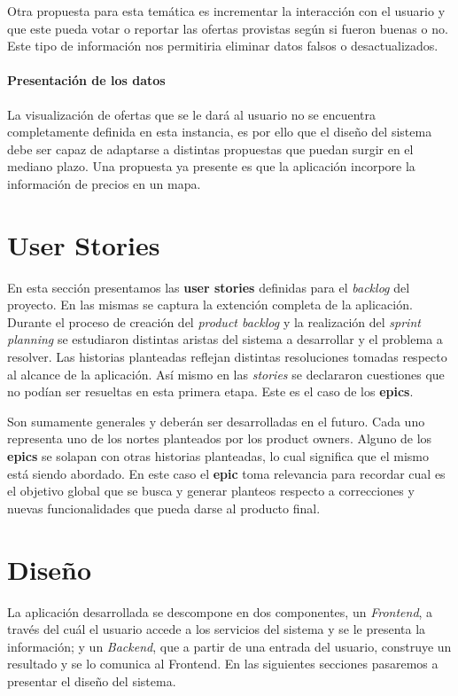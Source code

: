 \documentclass[10pt, a4paper]{article}
\begin{document}
Otra propuesta para esta temática es incrementar la interacción con el usuario y que este pueda votar o reportar las ofertas provistas según si fueron buenas o no. Este tipo de información nos permitiria eliminar datos falsos o desactualizados.

\paragraph{Presentación de los datos}
La visualización de ofertas que se le dará al usuario no se encuentra completamente definida en esta instancia, es por ello que el diseño del sistema debe ser capaz de adaptarse a distintas propuestas que puedan surgir en el mediano plazo. Una propuesta ya presente es que la aplicación incorpore la información de precios en un mapa.


\section{User Stories}

En esta sección presentamos las \textbf{user stories} definidas para el \emph{backlog} del proyecto. En las mismas se captura la extención completa de la aplicación. Durante el proceso de creación del \emph{product backlog} y la realización del \emph{sprint planning} se estudiaron distintas aristas del sistema a desarrollar y el problema a resolver. Las historias planteadas reflejan distintas resoluciones tomadas respecto al alcance de la aplicación. Así mismo en las \emph{stories} se declararon cuestiones que no podían ser resueltas en esta primera etapa. Este es el caso de los \textbf{epics}. 

Son sumamente generales y deberán ser desarrolladas en el futuro. Cada uno representa uno de los nortes planteados por los \textsf{product owners}. Alguno de los \textbf{epics} se solapan con otras historias planteadas, lo cual significa que el mismo está siendo abordado. En este caso el \textbf{epic} toma relevancia para recordar cual es el objetivo global que se busca y generar planteos respecto a correcciones y nuevas funcionalidades que pueda darse al producto final. 



\section{Diseño}

La aplicación desarrollada se descompone en dos componentes, un \emph{Frontend}, a través del cuál el usuario accede a los servicios del sistema y se le presenta la información; y un \emph{Backend}, que a partir de una entrada del usuario, construye un resultado y se lo comunica al Frontend. En las siguientes secciones pasaremos a presentar el diseño del sistema.
\end{document}
